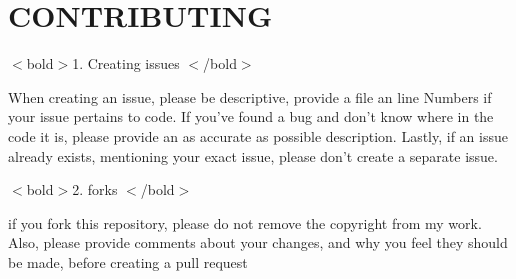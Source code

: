 \chapter{CONTRIBUTING}
\hypertarget{md__c_o_n_t_r_i_b_u_t_i_n_g}{}\label{md__c_o_n_t_r_i_b_u_t_i_n_g}
$<$bold$>$1. Creating issues $<$/bold$>$ \begin{DoxyVerb}  When creating an issue, please be descriptive, provide a file an line Numbers if your issue pertains to code. 
  If you've found a bug and don't know where in the code it is, please provide an as accurate as possible description.
  Lastly, if an issue already exists, mentioning your exact issue, please don't create a separate issue.
\end{DoxyVerb}
 $<$bold$>$2. forks $<$/bold$>$

\begin{DoxyVerb}    if you fork this repository, please do not remove the copyright from my work. 
    Also, please provide comments about your changes, and why you feel they should be made, before creating a pull request
\end{DoxyVerb}
 